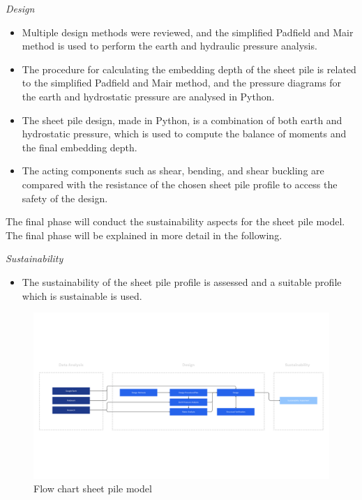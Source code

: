 \textit{Design}

\begin{itemize}
    \item Multiple design methods were reviewed, and the simplified Padfield and Mair method is used to perform the earth and hydraulic pressure analysis.
    \item The procedure for calculating the embedding depth of the sheet pile is related to the simplified Padfield and Mair method, and the pressure diagrams for the earth and hydrostatic pressure are analysed in Python.
    \item The sheet pile design, made in Python, is a combination of both earth and hydrostatic pressure, which is used to compute the balance of moments and the final embedding depth.
    \item The acting components such as shear, bending, and shear buckling are compared with the resistance of the chosen sheet pile profile to access the safety of the design.
\end{itemize}

The final phase will conduct the sustainability aspects for the sheet pile model. The final phase will be explained in more detail in the following.

\textit{Sustainability}

\begin{itemize}
    \item The sustainability of the sheet pile profile is assessed and a suitable profile which is sustainable is used. 
\end{itemize}

\begin{figure}[H]
    \centering
    \includegraphics[width=\linewidth]{figures/ch3/FlowChart Structural (3).png}
    \caption{Flow chart sheet pile model}
    \label{fig:flow_chart}
\end{figure}



